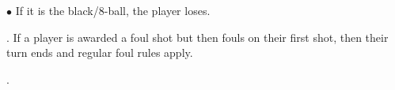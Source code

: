                    \hspace*{1.74em}$\bullet$\hspace*{0.15em} If it is the black/8-ball, the player loses.\itemspace
{}\JumpShot\itemspace
{}\TableMovement\itemspace
{}\PoorBehaviour
\par
\ex. If a player is awarded a foul shot but then fouls on their first shot, then their turn ends and regular foul rules apply.\par
\ex. \label{8ball:intentionalfoul}\IntentionalFoul\par

